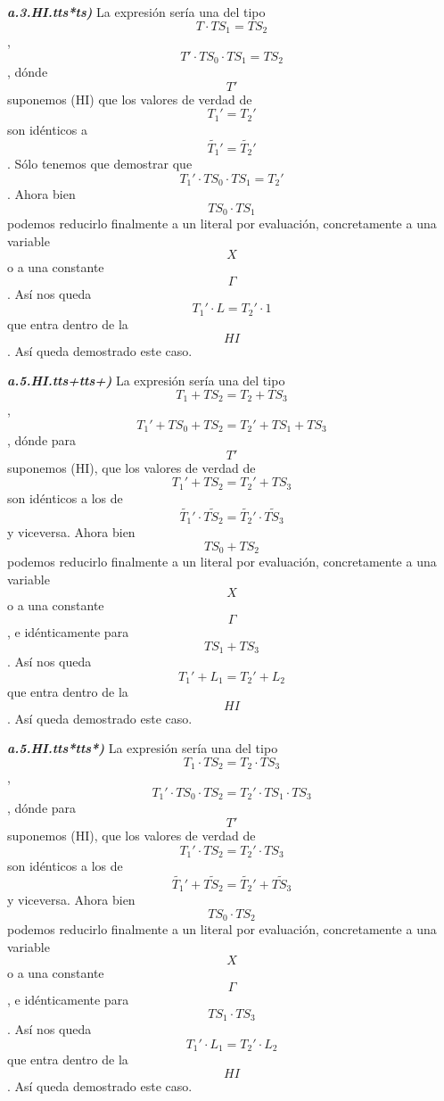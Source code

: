 \documentclass[
]{article}
\begin{document}
\begin{enumerate}
\begin{enumerate}
\begin{enumerate}
\begin{enumerate}
\begin{enumerate}
          \emph{\textbf{a.3.HI.tts*ts)}} La expresión sería una del tipo
          \[{T \cdot \mathit{TS}_{1}} = \mathit{TS}_{2}\] ,
          \[T{{{' \cdot \mathit{TS}_{0}} \cdot \mathit{TS}_{1}} = \mathit{TS}_{2}}\],
          dónde \[T'\]suponemos (HI) que los valores de ver\-dad de
          \[T_{1}{' = T_{2}}'\] son idénticos a
          \[\widetilde{T_{1}}{' = \widetilde{T_{2}}}'\]. Sólo tenemos
          que de\-mostrar que
          \[T_{1}{{{' \cdot \mathit{TS}_{0}} \cdot \mathit{TS}_{1}} = T_{2}}'\].
          Ahora bien \[\mathit{TS}_{0} \cdot \mathit{TS}_{1}\] podemos
          reducir\-lo finalmente a un literal por evaluación,
          concretamente a una variable \[X\] o a una constante
          \[\Gamma\]. Así nos queda
          \[T_{1}{{' \cdot L} = T_{2}}{' \cdot 1}\]que entra dentro de
          la \[\mathit{HI}\]. Así queda demostrado este caso.

          \emph{\textbf{a.5.HI.tts+tts+)}} La expresión sería una del
          tipo \[{T_{1} + \mathit{TS}_{2}} = {T_{2} + \mathit{TS}_{3}}\]
          ,
          \[T_{1}{{{' + \mathit{TS}_{0}} + \mathit{TS}_{2}} = T_{2}}{{' + \mathit{TS}_{1}} + \mathit{TS}_{3}}\],
          dónde para \[T'\] suponemos (HI), que los valores de verdad de
          \[T_{1}{{' + \mathit{TS}_{2}} = T_{2}}{' + \mathit{TS}_{3}}\]
          son idénticos a los de
          \[\widetilde{T_{1}}{{' \cdot \widetilde{\mathit{TS}_{2}}} = \widetilde{T_{2}}}{' \cdot \widetilde{\mathit{TS}_{3}}}\]
          y viceversa. Ahora bien \[\mathit{TS}_{0} + \mathit{TS}_{2}\]
          podemos redu\-cirlo finalmente a un literal por evaluación,
          concretamente a una variable \[X\] o a una constante
          \[\Gamma\], e idénticamente para
          \[\mathit{TS}_{1} + \mathit{TS}_{3}\]. Así nos queda
          \[T_{1}{{' + L_{1}} = T_{2}}{' + L_{2}}\]que entra dentro de
          la \[\mathit{HI}\]. Así queda demos\-trado este caso.

          \emph{\textbf{a.5.HI.tts*tts*)}} La expresión sería una del
          tipo
          \[{T_{1} \cdot \mathit{TS}_{2}} = {T_{2} \cdot \mathit{TS}_{3}}\]
          ,
          \[T_{1}{{{' \cdot \mathit{TS}_{0}} \cdot \mathit{TS}_{2}} = T_{2}}{{' \cdot \mathit{TS}_{1}} \cdot \mathit{TS}_{3}}\],
          dónde para \[T'\] suponemos (HI), que los valores de verdad de
          \[T_{1}{{' \cdot \mathit{TS}_{2}} = T_{2}}{' \cdot \mathit{TS}_{3}}\]
          son idénticos a los de
          \[\widetilde{T_{1}}{{' + \widetilde{\mathit{TS}_{2}}} = \widetilde{T_{2}}}{' + \widetilde{\mathit{TS}_{3}}}\]
          y viceversa. Ahora bien
          \[\mathit{TS}_{0} \cdot \mathit{TS}_{2}\] podemos redu\-cirlo
          finalmente a un literal por evaluación, concretamente a una
          variable \[X\] o a una constante \[\Gamma\], e idénticamente
          para \[\mathit{TS}_{1} \cdot \mathit{TS}_{3}\]. Así nos
          que\-da \[T_{1}{{' \cdot L_{1}} = T_{2}}{' \cdot L_{2}}\]que
          entra dentro de la \[\mathit{HI}\]. Así queda demostrado este
          caso.


\end{enumerate}
\end{enumerate}
\end{enumerate}
\end{enumerate}
\end{enumerate}
\end{document}
